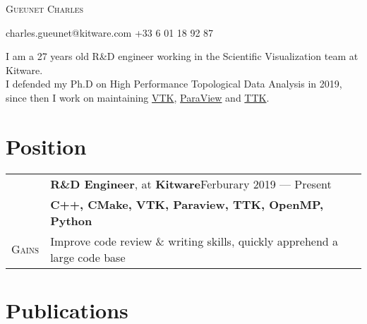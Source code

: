 \documentclass[a4paper, oneside, final]{scrartcl}
\newcommand{\rowBG}{\rowcolor{customRowBG!15}}
\begin{document}
\begin{center}

{\fontsize{36}{36}\selectfont\scshape Gueunet Charles} %

{\Large\Letter} charles.gueunet@kitware.com \hspace{0.2cm} {\Large\Telefon} +33 6 01 18 92 87

\vspace{0.4cm}

\begin{flushleft}
  I am a 27 years old R\&D engineer working in the Scientific Visualization
  team at Kitware.\\
  I defended my Ph.D on High Performance Topological Data Analysis in 2019,
  since then I work on maintaining \href{https://vtk.org/}{VTK},
  \href{https://www.paraview.org/}{ParaView} and
  \href{https://topology-tool-kit.github.io/}{TTK}\@.
\end{flushleft}

\vspace{0.1cm}

\section{Position}

\begin{tabularx}{1\linewidth}{>{\raggedleft\scshape}p{2.1cm}X}
  \rowBG{Position}  & \textbf{R\&D Engineer}, at \textbf{Kitware}\hfill{Ferburary 2019 --- Present}\\
  \rowBG{Languages} & \textbf{C++, CMake, VTK, Paraview, TTK, OpenMP, Python}\\
  Gains             & Improve code review \& writing skills, quickly apprehend a large code base
\end{tabularx}

\section{Publications}


\end{center}
\end{document}
